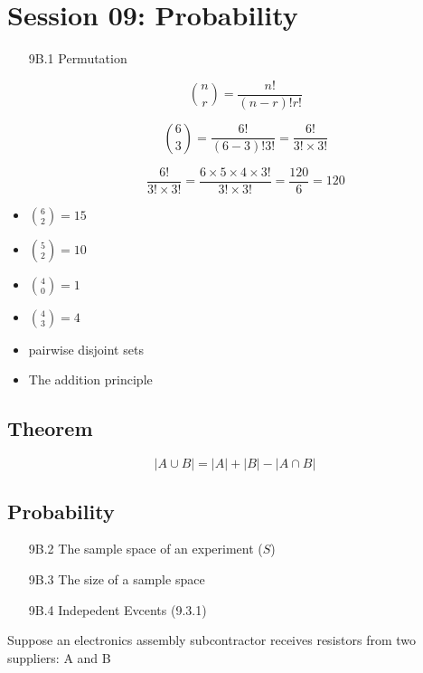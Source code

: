 \documentclass[12pt]{report}
\begin{document}
		\section*{Session 09: Probability}
		\begin{itemize}
			\item[9B.1] Permutation
			
			\[ {n \choose r} = \frac{n!}{(n-r)! r!} \]
			
			
			\[ {6 \choose 3} = \frac{6!}{(6-3)! 3!} = \frac{6!}{3! \times 3!}\]
			
			
			\[ \frac{6!}{3! \times 3!} = \frac{6 \times 5 \times 4 \times 3!}{3! \times 3!} = \frac{120}{6} = 120\]
		\end{itemize}
		
		\begin{itemize}
			\item ${6 \choose 2} = 15$
			\item ${5 \choose 2} = 10$  
			\item ${4 \choose 0} = 1$  
			\item ${4 \choose 3} = 4$  
		\end{itemize}
		
		\begin{itemize}
			\item pairwise disjoint sets
			\item The addition principle
		\end{itemize}
		\subsection*{Theorem}
		\[ |A \cup B| = |A| + |B| - |A \cap B|  \]
		
		\subsection*{Probability}
		\begin{itemize}
			\item[9B.2] The sample space of an experiment ($S$)
			\item[9B.3] The size of a sample space
			\item[9B.4] Indepedent Evcents (9.3.1)
		\end{itemize}
		
		
		\Large
		Suppose an electronics assembly subcontractor receives resistors from two suppliers: A and B
		
\end{document}
